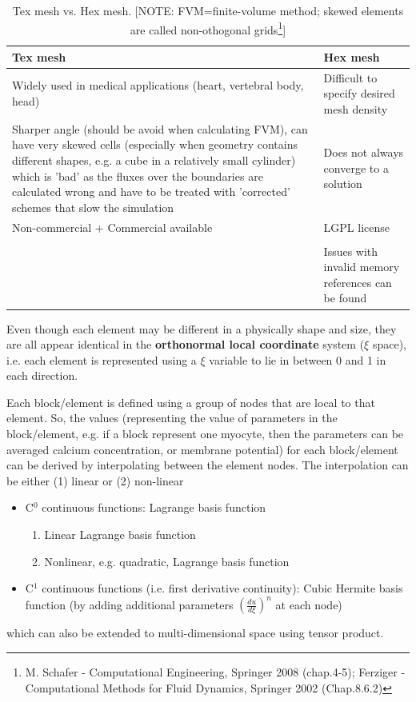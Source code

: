 \begin{table}[!hbt]
  \begin{center}
    \caption{Tex mesh vs. Hex mesh. [NOTE: FVM=finite-volume method; skewed
    elements are called non-othogonal grids\footnote{M. Schafer -
    Computational Engineering, Springer 2008 (chap.4-5); Ferziger -
    Computational Methods for Fluid Dynamics, Springer 2002 (Chap.8.6.2)}]}
    \begin{tabular}{p{5cm}p{5cm}} 
      \hline
      Tex mesh & Hex mesh\\ 
      \hline\hline
      Widely used in medical applications (heart, vertebral body, head) &
      Difficult to specify desired mesh density \\
      Sharper angle (should be avoid when calculating FVM), can have very skewed
      cells (especially when geometry contains different shapes, e.g. a cube in
      a relatively small cylinder) which is 'bad' as the fluxes over the
      boundaries are calculated wrong and have to be treated with 'corrected'
      schemes that slow the simulation & Does not always converge to a solution
      \\
       Non-commercial + Commercial available & LGPL license \\
      \\
      & Issues with invalid memory references can be found
    \end{tabular}
  \end{center}
  \label{tab:mesh_tet_hex}
\end{table}

Even though each element may be different in a physically shape and size, they
are all appear identical in the {\bf orthonormal local coordinate} system
($\xi$ space), i.e. each element is represented using a $\xi$ variable to lie
in between 0 and 1 in each direction. 

Each block/element is defined using a group of nodes that are local to that
element. So, the values (representing the value of parameters in the
block/element, e.g. if a block represent one myocyte, then the parameters can
be averaged calcium concentration, or membrane potential) for each
block/element can be derived by interpolating between the element nodes.
The interpolation can be either (1) linear or (2) non-linear
\begin{itemize}
  \item C$^0$ continuous functions: Lagrange basis function
  \begin{enumerate} 
  \item Linear Lagrange basis function	
  \item Nonlinear, e.g. quadratic, Lagrange basis function
  \end{enumerate}
  
  \item C$^1$ continuous functions (i.e. first derivative continuity): Cubic
  Hermite basis function (by adding additional parameters
  $\left(\frac{du}{d\xi}\right)^n$ at each node)
\end{itemize}
which can also be extended to multi-dimensional space using tensor product.

